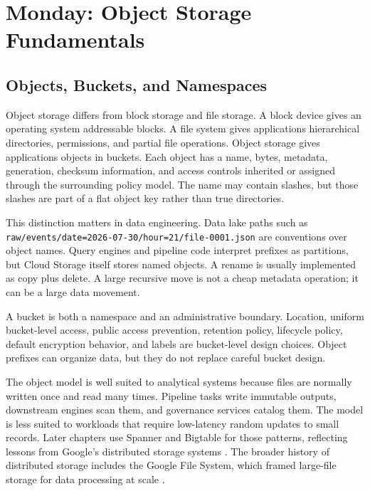 \section{Monday: Object Storage Fundamentals}

\subsection{Objects, Buckets, and Namespaces}
Object storage differs from block storage and file storage. A block device gives an operating system addressable blocks. A file system gives applications hierarchical directories, permissions, and partial file operations. Object storage gives applications objects in buckets. Each object has a name, bytes, metadata, generation, checksum information, and access controls inherited or assigned through the surrounding policy model. The name may contain slashes, but those slashes are part of a flat object key rather than true directories.

This distinction matters in data engineering. Data lake paths such as \texttt{raw/events/date=2026-07-30/hour=21/file-0001.json} are conventions over object names. Query engines and pipeline code interpret prefixes as partitions, but Cloud Storage itself stores named objects. A rename is usually implemented as copy plus delete. A large recursive move is not a cheap metadata operation; it can be a large data movement.

\begin{notebox}
A bucket is both a namespace and an administrative boundary. Location, uniform bucket-level access, public access prevention, retention policy, lifecycle policy, default encryption behavior, and labels are bucket-level design choices. Object prefixes can organize data, but they do not replace careful bucket design.
\end{notebox}

The object model is well suited to analytical systems because files are normally written once and read many times. Pipeline tasks write immutable outputs, downstream engines scan them, and governance services catalog them. The model is less suited to workloads that require low-latency random updates to small records. Later chapters use Spanner and Bigtable for those patterns, reflecting lessons from Google's distributed storage systems \cite{corbett2012spanner,chang2008bigtable}. The broader history of distributed storage includes the Google File System, which framed large-file storage for data processing at scale \cite{ghemawat2003gfs}.

